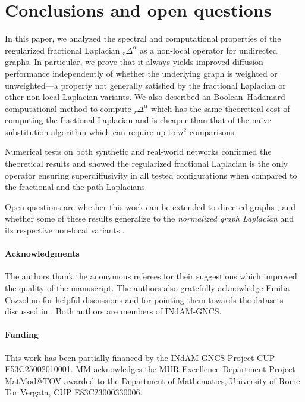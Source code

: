 \documentclass[a4paper,12pt]{article}
\newcommand{\fL}{\Delta^\alpha}
\newcommand{\rfL}{{}_r\fL}
\begin{document}
\section{Conclusions and open questions} 
\label{sec:conclusions}

In this paper, we analyzed the spectral and computational properties of the regularized fractional Laplacian $\rfL$ as a non-local operator for undirected graphs. In particular, we prove that it always yields improved diffusion performance independently of whether the underlying graph is weighted or unweighted—a property not generally satisfied by the fractional Laplacian or other non-local Laplacian variants. We also described an Boolean--Hadamard computational method to compute $\rfL$ which has the same theoretical cost of computing the fractional Laplacian and is cheaper than that of the naive substitution algorithm which can require up to $n^2$ comparisons.

Numerical tests on both synthetic and real-world networks confirmed the theoretical results and showed the regularized fractional Laplacian is the only operator ensuring superdiffusivity in all tested configurations when compared to the fractional and the path Laplacians. 

Open questions are whether this work can be extended to directed graphs \cite{Benzi_2020_fractional_laplacian}, and whether some of these results generalize to the \emph{normalized graph Laplacian} and its respective non-local variants \cite{Riascos_introduction_of_fractional_laplacian}. 	


\paragraph*{Acknowledgments}
 The authors thank the anonymous referees for their suggestions which improved the quality of the manuscript. The authors also gratefully acknowledge Emilia Cozzolino for helpful discussions and for pointing them towards the datasets discussed in \cite{braingraph}. Both authors are members of INdAM-GNCS.

\paragraph{Funding}
This work has been partially financed by the INdAM-GNCS Project CUP E53C25002010001. MM acknowledges the MUR Excellence Department Project MatMod@TOV awarded to the Department of Mathematics, University of Rome Tor Vergata, CUP E83C23000330006.



\end{document}

